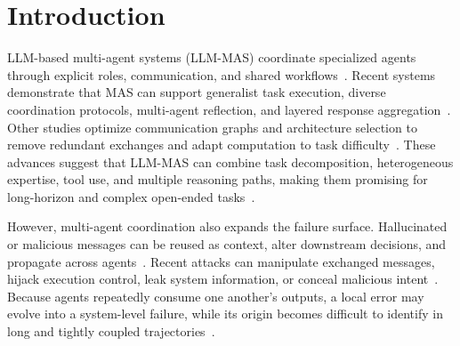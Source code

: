 \documentclass[letterpaper]{article} %
\begin{document}
\begin{abstract}
LLM-based multi-agent systems (LLM-MAS) solve complex tasks through specialized collaboration, but inter-agent dependencies can propagate hallucinated or malicious outputs into system-level failures. Auditor agents mitigate these risks, yet existing strategies face an efficiency dilemma: end-only auditing reviews long trajectories and final outputs, potentially weakening audit effectiveness and enlarging rollback scope, while auditing every agent each round improves detection and localization at high token cost. How can guard performance be preserved while minimizing token cost?
To address this problem, we propose BRA-Audit, a budget-aware runtime auditing framework that models MAS execution as a dynamic dependency graph and formulates audit scheduling as audit-point placement under a fixed audit-call budget to minimize cumulative unchecked exposure. Its greedy scheduler prioritizes influential and long-unaudited regions, while trusted audit points enable localized recovery. Across structured coordination, complex reasoning, and open-ended tasks, BRA-Audit restores performance close to the clean setting, remains competitive with heavy guard methods and reduces end-to-end token consumption by \(17.2\%\)--\(40.6\%\). 
\end{abstract}



\section{Introduction}
LLM-based multi-agent systems (LLM-MAS) coordinate specialized agents through explicit roles, communication, and shared workflows~\cite{hong2024metagpt,qian2024chatdev,chan2023chateval}. Recent systems demonstrate that MAS can support generalist task execution, diverse coordination protocols, multi-agent reflection, and layered response aggregation~\cite{fourney2024magenticonegeneralistmultiagentsolving,zhu2025multiagentbenchevaluatingcollaborationcompetition,wang2024mixtureofagentsenhanceslargelanguage}. Other studies optimize communication graphs and architecture selection to remove redundant exchanges and adapt computation to task difficulty~\cite{zhang2024cutcrapeconomicalcommunication,li2024survey,guo2024large}.
These advances suggest that LLM-MAS can combine task decomposition, heterogeneous expertise, tool use, and multiple reasoning paths, making them promising for long-horizon and complex open-ended tasks~\cite{tran2025collaboration,yan2026selftalk,li2023camel}.

However, multi-agent coordination also expands the failure surface. Hallucinated or malicious messages can be reused as context, alter downstream decisions, and propagate across agents~\cite{lee2024promptinfection,ju2024flooding,he2025redteaming}. Recent attacks can manipulate exchanged messages, hijack execution control, leak system information, or conceal malicious intent~\cite{triedman2025maliciouscode,wang2025masleak,xie2025mole}. Because agents repeatedly consume one another's outputs, a local error may evolve into a system-level failure, while its origin becomes difficult to identify in long and tightly coupled trajectories~\cite{xia2026agentlocate,zheng2025integrity}.
\end{document}
